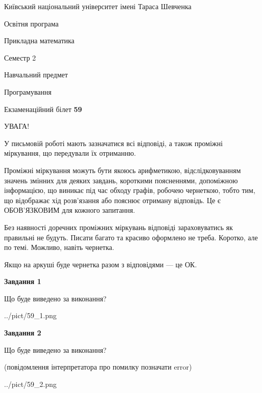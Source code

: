 \documentclass[12pt, ukrainian]{article}
\begin{document}
{{\begin {small}\par
{ \center  Київський національний університет імені Тараса Шевченка \par}
{\parbox {5 cm}{Освітня програма \hfill}{\parbox {7 cm}{Прикладна математика\hfill}}\parbox {6 cm}{\hfill Семестр 2}}\par
{\parbox {5 cm} {Навчальний предмет \hfill}\parbox {7 cm}{Програмування \hfill}\parbox {6cm}{\hfill}\par}\vspace{-7pt} \end{small}}{\center Екзаменаційний білет \No \textbf
{ 59 }\par}}
{
\begin {large}
УВАГА!

У письмовій роботі мають зазначатися всі відповіді, а також проміжні міркування, що передували їх отриманню.

Проміжні міркування можуть бути якоюсь арифметикою, відслідковуванням зна\-чень змінних для деяких завдань,
короткими поясненнями, допоміжною інформацією, що виникає під час обходу графів, робочею чернеткою,
тобто тим, що відображає хід розв’язання або пояснює отриману відповідь.
Це є ОБОВ’ЯЗКОВИМ для кожного запитання.

Без наявності доречних проміжних міркувань відповіді зараховуватись як правиль\-ні не будуть.
Писати багато та красиво оформлено не треба. Коротко, але по темі. Можли\-во, навіть чернетка.

Якщо на аркуші буде чернетка разом з відповідями --- це ОК.

\newpage

{\begin {center}\textbf{Завдання 1}\end {center}}\par
Що буде виведено за виконання?\par
\begin{center}
	{../pict/59_1.png}
\end{center}
\newpage

{\begin {center}\textbf{Завдання 2}\end {center}}\par
Що буде виведено за виконання?\par
 (повідомлення інтерпретатора про помилку позначати error)\par
\begin{center}
	{../pict/59_2.png}
\end{center}
\newpage


\end{large}}
\end{document}
